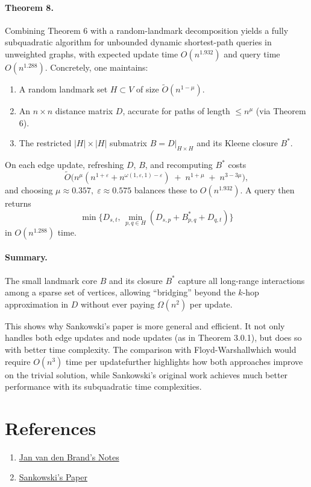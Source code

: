 \documentclass[12pt]{article}
\begin{document}
\paragraph{Theorem 8.}
Combining Theorem 6 with a random-landmark decomposition yields a fully subquadratic algorithm for unbounded dynamic shortest-path queries in unweighted graphs, with expected update time $O(n^{1.932})$ and query time $O(n^{1.288})$.  Concretely, one maintains:
\begin{enumerate}
    \item A random landmark set $H\subset V$ of size $\tilde O(n^{1-\mu})$.
    \item An $n\times n$ distance matrix $D$, accurate for paths of length $\le n^\mu$ (via Theorem 6).
    \item The restricted $|H|\times|H|$ submatrix $B=D|_{H\times H}$ and its Kleene closure $B^*$.
\end{enumerate}
On each edge update, refreshing $D$, $B$, and recomputing $B^*$ costs
\[
    \tilde O\!\bigl(n^\mu(n^{1+\varepsilon}+n^{\omega(1,\varepsilon,1)-\varepsilon}) \;+\; n^{1+\mu}\;+\;n^{3-3\mu}\bigr),
\]
and choosing $\mu\approx0.357,\;\varepsilon\approx0.575$ balances these to $O(n^{1.932})$.  A query then returns
\[
    \min\!\bigl\{D_{s,t},\,\min_{p,q\in H}\!(D_{s,p}+B^*_{p,q}+D_{q,t})\bigr\}
\]
in $O(n^{1.288})$ time.

\paragraph{Summary.}
The small landmark core $B$ and its closure $B^*$ capture all long-range interactions among a sparse set of vertices, allowing “bridging” beyond the $k$-hop approximation in $D$ without ever paying $\Omega(n^2)$ per update.

This shows why Sankowski's paper is more general and efficient. It not only handles both edge updates and node updates (as in Theorem 3.0.1), but does so with better time complexity. The comparison with Floyd-Warshall\textemdash which would require $O(n^3)$ time per update\textemdash further highlights how both approaches improve on the trivial solution, while Sankowski's original work achieves much better performance with its subquadratic time complexities.

\section*{References}

\begin{enumerate}
    \item \href{https://www.dropbox.com/scl/fi/zjfbk8dbxbzcn05dr8l11/fall22_daa_lecturenotes.pdf?rlkey=g6z7z1hvj7jknvlpy1s3dqcjw&e=1&st=13r18doq&dl=0}{Jan van den Brand's Notes}
    \item \href{https://www.dropbox.com/scl/fi/5w4k0lg0u8e36zugapp6c/Sankowski-COCOON-05-subquadratic-dynamic-distances.pdf?rlkey=5eahwsl7a49kwxyvlr7yqyoz3&e=2&st=d3zo7owc&dl=0}{Sankowski's Paper}
\end{enumerate}
\end{document}
